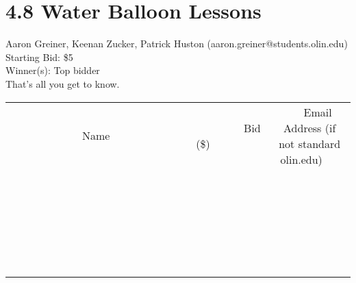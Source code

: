 \documentclass[11pt]{article}
\begin{document}
\section*{4.8 Water Balloon Lessons}
Aaron Greiner, Keenan Zucker, Patrick Huston (aaron.greiner@students.olin.edu) \\
Starting Bid: \$5 \\
Winner(s): 
Top bidder \\
That's all you get to know. \\[6ex]
\begin{tabular}{c c c}
~~~~~~~~~~~~~Name~~~~~~~~~~~~~ & ~~~~~~~~~Bid (\$)~~~~~~~~~ & ~~~Email Address (if not standard olin.edu)~~~ \\
 & & \\
\hline
 & & \\
\hline
 & & \\
\hline
 & & \\
\hline
 & & \\
\hline
 & & \\
\hline
 & & \\
\hline
 & & \\
\hline
 & & \\
\hline
 & & \\
\hline
 & & \\
\hline
 & & \\
\hline
 & & \\
\hline
 & & \\
\hline
 & & \\
\hline
 & & \\
\hline
 & & \\
\hline
 & & \\
\hline
 & & \\
\hline
 & & \\
\hline
 & & \\
\hline
 & & \\
\hline
 & & \\
\hline
 & & \\
\hline
 & & \\
\hline
 & & \\
\hline
\end{tabular}
\clearpage
\end{document}
